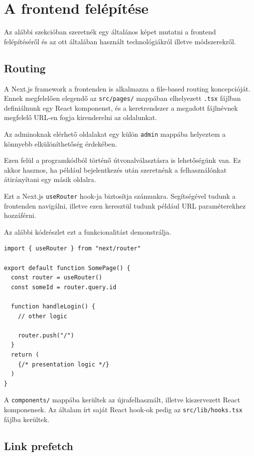\section{A frontend felépítése}

Az alábbi szekcióban szeretnék egy általános képet mutatni a frontend felépítéséről és az ott általában használt technológiákról illetve módszerekről.

\subsection{Routing}

A Next.js framework a frontenden is alkalmazza a file-based routing koncepcióját. Ennek megfelelően elegendő az \lstinline|src/pages/|
mappában elhelyezett \lstinline|.tsx| fájlban definiálnunk egy React komponenst, és a keretrendszer a megadott fájlnévnek megfelelő URL-en
fogja kirenderelni az oldalunkat.

Az adminoknak elérhető oldalakat egy külön \lstinline|admin| mappába helyeztem a könnyebb elkülöníthetőség érdekében.

Ezen felül a programkódból történő útvonalválasztásra is lehetőségünk van. Ez akkor hasznos, ha például bejelentkezés után szeretnénk
a felhasználónkat átirányítani egy másik oldalra.

Ezt a Next.js \lstinline|useRouter| hook-ja biztosítja számunkra. Segítségével tudunk a frontenden navigálni, illetve ezen keresztül
tudunk például URL paraméterekhez hozzáférni.

Az alábbi kódrészlet ezt a funkcionalitást demonstrálja.

\begin{lstlisting}[caption=Next.js kliensoldali router használata]
import { useRouter } from "next/router"

export default function SomePage() {
  const router = useRouter()
  const someId = router.query.id

  function handleLogin() {
    // other logic

    router.push("/")
  }
  return (
    {/* presentation logic */}
  )
}
\end{lstlisting}

A \lstinline|components/| mappába kerültek az újrafelhasznált, illetve kiszervezett React komponensek.
Az általam írt saját React hook-ok pedig az \lstinline|src/lib/hooks.tsx| fájlba kerültek.

\subsection{Link prefetch}

